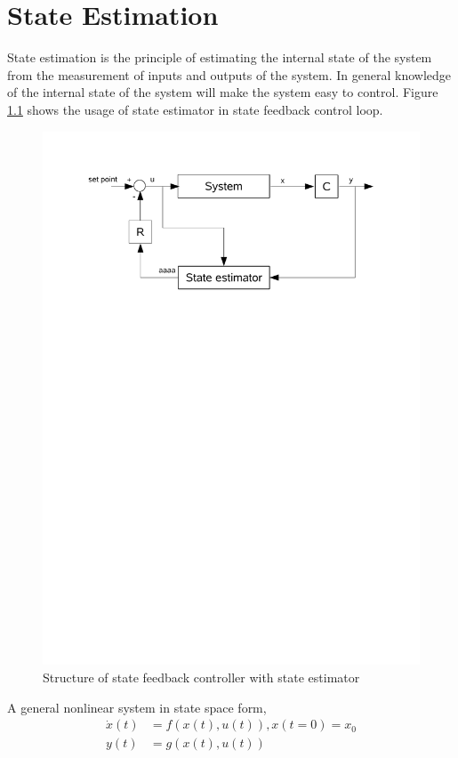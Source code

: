 \chapter{State Estimation}
\label{ch:st_est}
State estimation is the principle of estimating the internal state of the system from the measurement of inputs and outputs of the system. In general knowledge of the internal state of the system will make the system easy to control. Figure \ref{fig:observer} shows the usage of state estimator in state feedback control loop.
\begin{figure}[h]
  \centering
  \includegraphics[trim = 10mm 200mm 20mm 20mm, clip,scale=0.80]{Bilder/system_observer.pdf}
  \caption{Structure of state feedback controller with state estimator}
  \label{fig:observer}
\end{figure}

A general nonlinear system in state space form,
\begin{equation}
\begin{split}
\label{eqn:nl_sys}
\dot{x}(t) &= f(x(t),u(t)) , x(t=0) = x_0 \\
y(t) &= g(x(t),u(t))
\end{split}
\end{equation}


